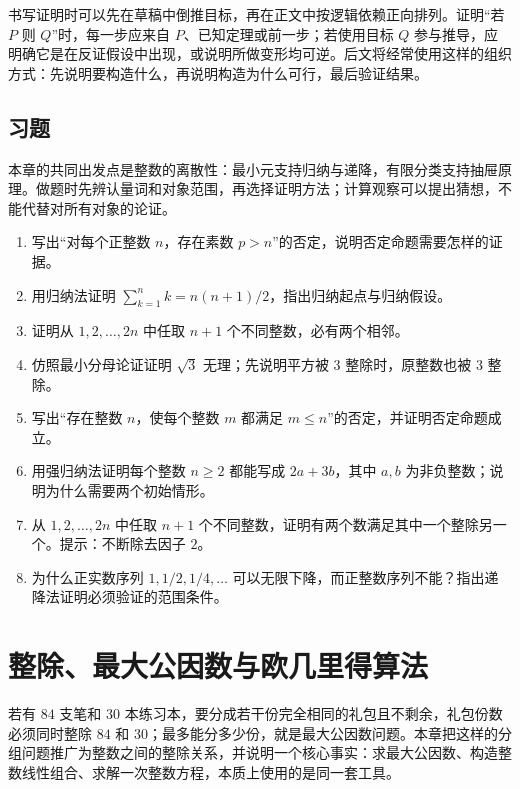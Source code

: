 \documentclass[UTF8,12pt,a4paper,fontset=fandol]{ctexbook}
\begin{document}
书写证明时可以先在草稿中倒推目标，再在正文中按逻辑依赖正向排列。证明“若 $P$ 则 $Q$”时，每一步应来自 $P$、已知定理或前一步；若使用目标 $Q$ 参与推导，应明确它是在反证假设中出现，或说明所做变形均可逆。后文将经常使用这样的组织方式：先说明要构造什么，再说明构造为什么可行，最后验证结果。

\section{习题}

本章的共同出发点是整数的离散性：最小元支持归纳与递降，有限分类支持抽屉原理。做题时先辨认量词和对象范围，再选择证明方法；计算观察可以提出猜想，不能代替对所有对象的论证。

\begin{enumerate}
  \item 写出“对每个正整数 $n$，存在素数 $p>n$”的否定，说明否定命题需要怎样的证据。
  \item 用归纳法证明 $\sum_{k=1}^n k=n(n+1)/2$，指出归纳起点与归纳假设。
  \item 证明从 $1,2,\ldots,2n$ 中任取 $n+1$ 个不同整数，必有两个相邻。
  \item 仿照最小分母论证证明 $\sqrt3$ 无理；先说明平方被 $3$ 整除时，原整数也被 $3$ 整除。
 \item\label{ex:intro-negation} 写出“存在整数 $n$，使每个整数 $m$ 都满足 $m\le n$”的否定，并证明否定命题成立。
 \item\label{ex:intro-strong} 用强归纳法证明每个整数 $n\ge2$ 都能写成 $2a+3b$，其中 $a,b$ 为非负整数；说明为什么需要两个初始情形。
 \item\label{ex:intro-dividing-pair} 从 $1,2,\ldots,2n$ 中任取 $n+1$ 个不同整数，证明有两个数满足其中一个整除另一个。提示：不断除去因子 $2$。
 \item\label{ex:intro-descent-domain} 为什么正实数序列 $1,1/2,1/4,\ldots$ 可以无限下降，而正整数序列不能？指出递降法证明必须验证的范围条件。
\end{enumerate}

\chapter{整除、最大公因数与欧几里得算法}
\label{ch:divisibility}

若有 $84$ 支笔和 $30$ 本练习本，要分成若干份完全相同的礼包且不剩余，礼包份数必须同时整除 $84$ 和 $30$；最多能分多少份，就是最大公因数问题。本章把这样的分组问题推广为整数之间的整除关系，并说明一个核心事实：求最大公因数、构造整数线性组合、求解一次整数方程，本质上使用的是同一套工具。
\end{document}
